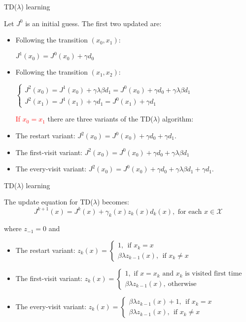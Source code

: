 \documentclass{beamer}
\def\X{{\mathcal X}}
\newcommand{\red}[1]{\textcolor{red}{#1}}
\begin{document}
\begin{frame}{TD($\lambda$) learning}

 Let $J^0$ is an initial guess.   The first two updated are:
\begin{itemize}
 \item  Following the transition $(x_0, x_1):$

  $J^1(x_0) = J^0(x_0)+\gamma d_0$


 \item  Following the transition $(x_1, x_2):$

  $
  \begin{cases}
  J^2(x_0) = J^1(x_0)+\gamma \lambda \beta  d_1=  J^0(x_0)+\gamma d_0+\gamma \lambda \beta  d_1\\
  J^2(x_1) = J^1(x_1)+\gamma  d_1 = J^0(x_1)+\gamma  d_1
  \end{cases}
  $
  
\red{If $x_0 = x_1$} there are three variants of the TD($\lambda$) algorithm:


\item The restart variant:
$J^2(x_0) = J^0(x_0) +\gamma d_0+\gamma d_1.$
  \item The first-visit variant:
  $J^2(x_0) =  J^0(x_0)+\gamma d_0+\gamma \lambda \beta  d_1$

\item The every-visit variant:
$J^2(x_0) = J^0(x_0)+\gamma d_0+\gamma \lambda \beta  d_1 +\gamma d_1.$


\end{itemize}

\end{frame}

\begin{frame}{TD($\lambda$) learning}

 The update equation for TD($\lambda$) becomes:
 $$
 J^{k+1}(x) = J^{k}(x)+\gamma_k(x)z_k(x)d_k(x), \text{ for each }x\in \X
 $$

where $z_{-1}=0$ and

\begin{itemize}
\item The restart variant:
$z_k(x) = \begin{cases}1,  ~~\text{if }x_k= x\\
\beta\lambda z_{k-1}(x), ~~\text{if }x_k\neq x
 \end{cases}$
  \item The first-visit variant:
  $z_k(x) = \begin{cases}1, \text{ if } x=x_k\text{ and } x_k \text{ is visited first time}\\
  \beta\lambda z_{k-1}(x), ~\text{otherwise}
  \end{cases}$

\item The every-visit variant:
$z_k(x) = \begin{cases}\beta\lambda z_{k-1}(x)+1,  ~~\text{if }x_k= x\\
\beta\lambda z_{k-1}(x), ~~\text{if }x_k\neq x
 \end{cases}$
\end{itemize}
\end{frame}
\end{document}
